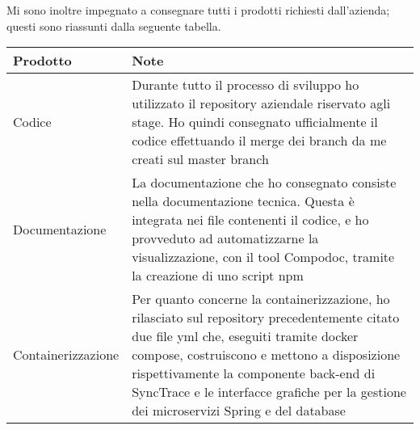 Mi sono inoltre impegnato a consegnare tutti i prodotti richiesti dall'azienda; questi sono riassunti dalla seguente tabella.

\begin{table}[h]
    \begin{center}
\begin{tabularx}{\textwidth}{lX}
\textbf{Prodotto}                        & \textbf{Note}                                                                                                                                                                                                                                                                                                                                    \\ \hline
\multicolumn{1}{|l|}{Codice}             & \multicolumn{1}{l|}{Durante tutto il processo di sviluppo ho utilizzato il repository aziendale riservato agli stage. Ho quindi consegnato ufficialmente il codice effettuando il merge dei branch da me creati sul master branch}                                                                                                               \\ \hline
\multicolumn{1}{|l|}{Documentazione}     & \multicolumn{1}{l|}{La documentazione che ho consegnato consiste nella documentazione tecnica. Questa è integrata nei file contenenti il codice, e ho provveduto ad automatizzarne la visualizzazione, con il tool Compodoc, tramite la creazione di uno script npm}                                                                             \\ \hline
\multicolumn{1}{|l|}{Containerizzazione} & \multicolumn{1}{l|}{Per quanto concerne la containerizzazione, ho rilasciato sul repository precedentemente citato due file yml che, eseguiti tramite docker compose, costruiscono e mettono a disposizione rispettivamente la componente back-end di SyncTrace e le interfacce grafiche per la gestione dei microservizi Spring e del database} \\ \hline
\end{tabularx}
\end{center}
\end{table}


